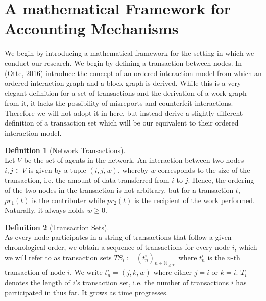 \documentclass[11pt,a4paper]{article}
\theoremstyle{definition}
\newtheorem{definition}{Definition}[section]
\theoremstyle{theorem}
\theoremstyle{proposition}
\theoremstyle{corollary}
\theoremstyle{lemma}
\theoremstyle{example}
\theoremstyle{remark}
\begin{document}
\section{A mathematical Framework for Accounting Mechanisms}
\label{sec:A mathematical Framework for Accounting Mechanisms}
\noindent{}We begin by introducing a mathematical framework for the setting in which we conduct our research. We begin by defining a transaction between nodes. In \cite{Sybil-resistant Trust Mechanisms in Distributed Systems} (Otte, 2016) introduce the concept of an ordered interaction model from which an ordered interaction graph and a block graph is derived. While this is a very elegant definition for a set of transactions and the derivation of a work graph from it, it lacks the possibility of misreports and counterfeit interactions. Therefore we will not adopt it in here, but instead derive a slightly different definition of a transaction set which will be our equivalent to their ordered interaction model.\vspace{1em}\\


\begin{definition}[Network Transactions]\ \\
Let $V$ be the set of agents in the network. An interaction between two nodes $i,j\in{}V$ is given by a tuple $(i,j,w)$, whereby $w$ corresponds to the size of the transaction, i.e. the amount of data transferred from $i$ to $j$. Hence, the ordering of the two nodes in the transaction is not arbitrary, but for a transaction $t$, $pr_1(t)$ is the contributer while $pr_2(t)$ is the recipient of the work performed. Naturally, it always holds $w\geq{}0$. \vspace{1em}\\
\end{definition}

\begin{definition}[Transaction Sets]\ \\
\noindent{}As every node participates in a string of transactions that follow a given chronological order, we obtain a sequence of transactions for every node $i$, which we will refer to as transaction sets $TS_i:=(t^i_n)_{n\in\mathbb{N}_{\leq{}T_i}}$ where $t^i_n$ is the $n$-th transaction of node $i$. We write $t^i_n=(j,k,w)$ where either $j=i$ or $k=i$. $T_i$ denotes the length of $i$'s transaction set, i.e. the number of transactions $i$ has participated in thus far. It grows as time progresses.\vspace{1em}\\
\end{definition}
\end{document}
